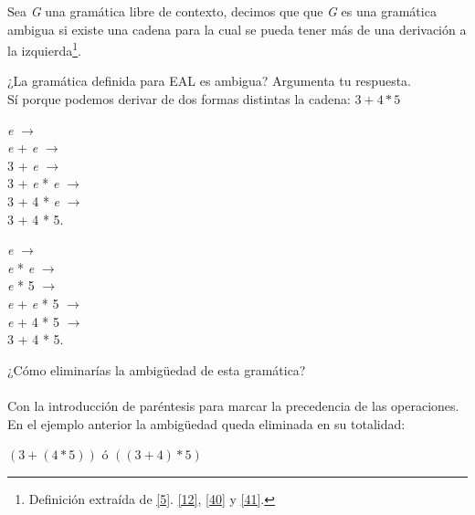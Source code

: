     \begin{definition}
        Sea \textit{G} una gramática libre de contexto, decimos que que \textit{G} es una gramática ambigua si existe una cadena para la cual se pueda tener más de una derivación a la izquierda\footnote{Definición extraída de \hyperlink{5}{[5]}. \hyperlink{12}{[12]}, \hyperlink{40}{[40]} y \hyperlink{41}{[41]}.}.
    \end{definition}


    \begin{exercise}
        ¿La gramática definida para \textsf{EAL} es ambigua? Argumenta tu respuesta.                          \\
             Sí porque podemos derivar de dos formas distintas la cadena: $3 + 4 * 5$                            
             \begin{center}
                 \textit{e} $\rightarrow$ \\
                 \textit{e} + \textit{e} $\rightarrow$ \\
                 3 + \textit{e} $\rightarrow$ \\
                 3 + \textit{e} * \textit{e} $\rightarrow$ \\
                 3 + 4 * \textit{e} $\rightarrow$ \\
                 3 + 4 * 5.  \\
                 
                 \bigskip
                 
                 \textit{e} $\rightarrow$ \\
                 \textit{e} * \textit{e} $\rightarrow$ \\
                 \textit{e} * 5 $\rightarrow$ \\
                 \textit{e} + \textit{e} * 5 $\rightarrow$ \\
                 \textit{e} + 4 * 5 $\rightarrow$ \\
                 3 + 4 * 5.
             \end{center}
    \end{exercise}

    \bigskip

    \begin{exercise}
        ¿Cómo eliminarías la ambigüedad de esta gramática?    \\\\                    
            Con la introducción de paréntesis para marcar la precedencia de las operaciones. 
            En el ejemplo anterior la ambigüedad queda eliminada en su totalidad:
            \begin{center}
                $(3 + (4 * 5))$  ó $((3 + 4 )* 5)$
            \end{center}
    \end{exercise}


